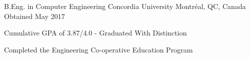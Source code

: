 

\begin{cventries}

  \cventry
    {B.Eng. in Computer Engineering} %
    {Concordia University} %
    {Montréal, QC, Canada} %
    {Obtained May 2017} %
    {
      \begin{cvitems} %
        \item {Cumulative GPA of 3.87/4.0 - Graduated With Distinction}
        \item {Completed the Engineering Co-operative Education Program}
      \end{cvitems}
    }

\end{cventries}
